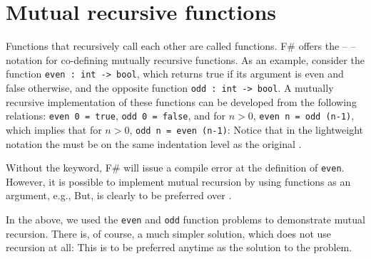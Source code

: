 \section{Mutual recursive functions}
Functions that recursively call each other are called  functions. F\# offers the  --  --  notation for co-defining mutually recursive functions. As an example, consider the function \mbox{\lstinline!even : int -> bool!}, which returns true if its argument is even and false otherwise, and the opposite function \mbox{\lstinline!odd : int -> bool!}. A mutually recursive implementation of these functions can be developed from the following relations: \mbox{\lstinline!even 0 = true!}, \mbox{\lstinline!odd 0 = false!}, and for $n>0$, \mbox{\lstinline!even n = odd (n-1)!}, which implies that for $n>0$, \mbox{\lstinline!odd n = even (n-1)!}:
%
%
Notice that in the lightweight notation the  must be on the same indentation level as the original .

Without the  keyword, F\# will issue a compile error at the definition of \lstinline!even!. However, it is possible to implement mutual recursion by using functions as an argument, e.g.,
%
%
But,  is clearly to be preferred over . 

In the above, we used the \lstinline!even! and \lstinline!odd! function problems to demonstrate mutual recursion. There is, of course, a much simpler solution, which does not use recursion at all:
%
%
This is to be preferred anytime as the solution to the problem. 


